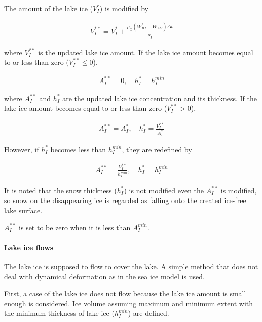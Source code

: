 The amount of the lake ice (\(V_I^{\ast}\)) is modified by

\begin{eqnarray}
    V_I^{\ast\ast} = V_I^{\ast} + \frac{\rho_O (W_{IO}^\ast+W_{AO})\Delta t}{\rho_I}
\end{eqnarray}

where \(V_I^{\ast\ast}\) is the updated lake ice amount. If the lake ice amount becomes equal to or less than zero (\(V_I^{\ast\ast}\le0\)),

\begin{eqnarray}
  A_I^{\ast\ast}=0, \quad h_I^{\ast}=h_I^{min}
\end{eqnarray}

where \(A_I^{\ast\ast}\) and \(h_I^\ast\) are the updated lake ice concentration and its thickness. If the lake ice amount becomes equal to or less than zero (\(V_I^{\ast\ast}>0\)),

\begin{eqnarray}
  A_I^{\ast\ast}=A_I^\ast, \quad h_I^{\ast}=\frac{V_{I}^{\ast\ast}}{A_I^{\ast}}
\end{eqnarray}

However, if \(h_I^{\ast}\) becomes less than \(h_I^{min}\), they are redefined by

\begin{eqnarray}
  A_I^{\ast\ast}=\frac{V_I^{\ast\ast}}{h_I^{min}},\quad h_I^{\ast} = h_I^{min}
\end{eqnarray}

It is noted that the snow thickness (\(h_I^{\ast}\)) is not modified even the \(A_I^{\ast\ast}\) is modified, so snow on the disappearing ice is regarded as falling onto the created ice-free lake
surface.

\(A_I^{\ast\ast}\) is set to be zero when it is less than \(A_I^{min}\).

\paragraph{Lake ice flows}\label{lake-ice-flows}

The lake ice is supposed to flow to cover the lake. A simple method that does not deal with dynamical deformation as in the sea ice model\citep{Hasumi2015-fs} is used.

First, a case of the lake ice does not flow because the lake ice amount is small enough is considered. Ice volume assuming maximum and minimum extent with the minimum thickness of lake ice
(\(h_I^{min}\)) are defined.

